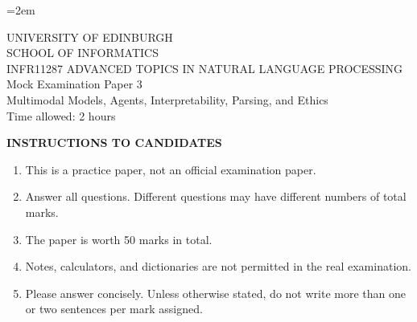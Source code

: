 \documentclass[11pt,a4paper]{article}
\begin{document}
\emergencystretch=2em

\begin{center}
{\Large UNIVERSITY OF EDINBURGH}\\[0.3em]
{\large SCHOOL OF INFORMATICS}\\[2em]
{\Large INFR11287 ADVANCED TOPICS IN NATURAL LANGUAGE PROCESSING}\\[1em]
{\Large Mock Examination Paper 3}\\[0.8em]
{\large Multimodal Models, Agents, Interpretability, Parsing, and Ethics}\\[2em]
{\large Time allowed: 2 hours}\\[1em]
\end{center}

\noindent\textbf{INSTRUCTIONS TO CANDIDATES}
\begin{enumerate}
\item This is a practice paper, not an official examination paper.
\item Answer all questions. Different questions may have different numbers of total marks.
\item The paper is worth 50 marks in total.
\item Notes, calculators, and dictionaries are not permitted in the real examination.
\item Please answer concisely. Unless otherwise stated, do not write more than one or two sentences per mark assigned.
\end{enumerate}

\newpage
\end{document}
